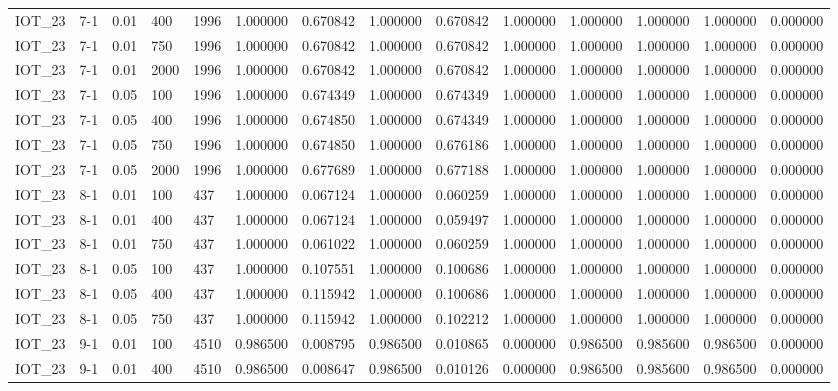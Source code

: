 \begin{tabular}{llllllllllllll}
IOT\_23 & 7-1 & 0.01 & 400 & 1996 & 1.000000 & 0.670842 & 1.000000 & 0.670842 & 1.000000 & 1.000000 & 1.000000 & 1.000000 & 0.000000 \\
IOT\_23 & 7-1 & 0.01 & 750 & 1996 & 1.000000 & 0.670842 & 1.000000 & 0.670842 & 1.000000 & 1.000000 & 1.000000 & 1.000000 & 0.000000 \\
IOT\_23 & 7-1 & 0.01 & 2000 & 1996 & 1.000000 & 0.670842 & 1.000000 & 0.670842 & 1.000000 & 1.000000 & 1.000000 & 1.000000 & 0.000000 \\
IOT\_23 & 7-1 & 0.05 & 100 & 1996 & 1.000000 & 0.674349 & 1.000000 & 0.674349 & 1.000000 & 1.000000 & 1.000000 & 1.000000 & 0.000000 \\
IOT\_23 & 7-1 & 0.05 & 400 & 1996 & 1.000000 & 0.674850 & 1.000000 & 0.674349 & 1.000000 & 1.000000 & 1.000000 & 1.000000 & 0.000000 \\
IOT\_23 & 7-1 & 0.05 & 750 & 1996 & 1.000000 & 0.674850 & 1.000000 & 0.676186 & 1.000000 & 1.000000 & 1.000000 & 1.000000 & 0.000000 \\
IOT\_23 & 7-1 & 0.05 & 2000 & 1996 & 1.000000 & 0.677689 & 1.000000 & 0.677188 & 1.000000 & 1.000000 & 1.000000 & 1.000000 & 0.000000 \\
IOT\_23 & 8-1 & 0.01 & 100 & 437 & 1.000000 & 0.067124 & 1.000000 & 0.060259 & 1.000000 & 1.000000 & 1.000000 & 1.000000 & 0.000000 \\
IOT\_23 & 8-1 & 0.01 & 400 & 437 & 1.000000 & 0.067124 & 1.000000 & 0.059497 & 1.000000 & 1.000000 & 1.000000 & 1.000000 & 0.000000 \\
IOT\_23 & 8-1 & 0.01 & 750 & 437 & 1.000000 & 0.061022 & 1.000000 & 0.060259 & 1.000000 & 1.000000 & 1.000000 & 1.000000 & 0.000000 \\
IOT\_23 & 8-1 & 0.05 & 100 & 437 & 1.000000 & 0.107551 & 1.000000 & 0.100686 & 1.000000 & 1.000000 & 1.000000 & 1.000000 & 0.000000 \\
IOT\_23 & 8-1 & 0.05 & 400 & 437 & 1.000000 & 0.115942 & 1.000000 & 0.100686 & 1.000000 & 1.000000 & 1.000000 & 1.000000 & 0.000000 \\
IOT\_23 & 8-1 & 0.05 & 750 & 437 & 1.000000 & 0.115942 & 1.000000 & 0.102212 & 1.000000 & 1.000000 & 1.000000 & 1.000000 & 0.000000 \\
IOT\_23 & 9-1 & 0.01 & 100 & 4510 & 0.986500 & 0.008795 & 0.986500 & 0.010865 & 0.000000 & 0.986500 & 0.985600 & 0.986500 & 0.000000 \\
IOT\_23 & 9-1 & 0.01 & 400 & 4510 & 0.986500 & 0.008647 & 0.986500 & 0.010126 & 0.000000 & 0.986500 & 0.985600 & 0.986500 & 0.000000 \\

\end{tabular}
